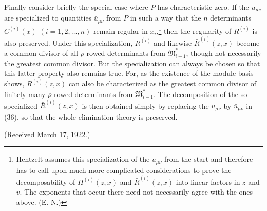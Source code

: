 \documentclass[11pt]{article}
\providecommand{\Mmod}{\mathfrak M}
\begin{document}
Finally consider briefly the special case where $P$ has characteristic zero. If the $u_{\mu\nu}$ are specialized to quantities $\bar u_{\mu\nu}$ from $P$ in such a way that the $n$ determinants $C^{(i)}(x)$ $(i=1,2,
\ldots,n)$ remain regular in $x_i$,\footnote{Hentzelt assumes this specialization of the $u_{\mu\nu}$ from the start and therefore has to call upon much more complicated considerations to prove the decomposability of $H^{(i)}(z,x)$ and $\bar R^{(i)}(z,x)$ into linear factors in $z$ and $v$. The exponents that occur there need not necessarily agree with the ones above. (E. N.)} then the regularity of $R^{(i)}$ is also preserved. Under this specialization, $R^{(i)}$ and likewise $\bar R^{(i)}(z,x)$ become a common divisor of all $\rho$-rowed determinants from $\Mmod^*_{i-1}$, though not necessarily the greatest common divisor. But the specialization can always be chosen so that this latter property also remains true. For, as the existence of the module basis shows, $R^{(i)}(z,x)$ can also be characterized as the greatest common divisor of finitely many $\rho$-rowed determinants from $\Mmod^*_{i-1}$. The decomposition of the so specialized $\bar R^{(i)}(z,x)$ is then obtained simply by replacing the $u_{\mu\nu}$ by $\bar u_{\mu\nu}$ in (36), so that the whole elimination theory is preserved.

\begin{center}
(Received March 17, 1922.)
\end{center}
\end{document}
